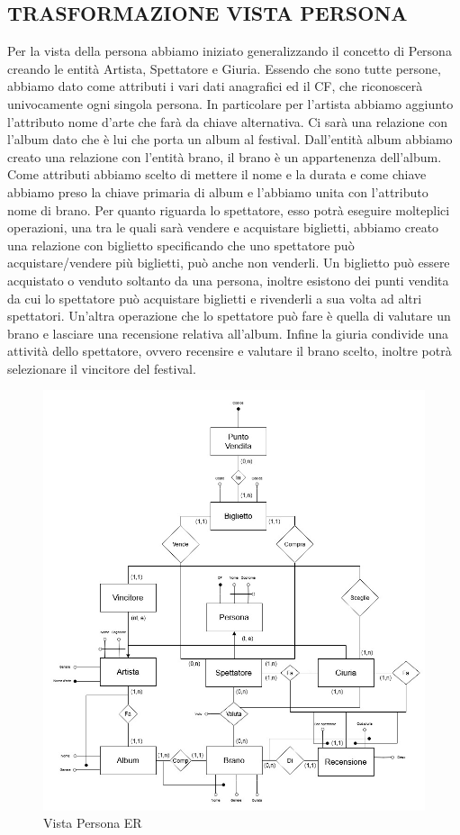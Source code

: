 \documentclass{article}
\begin{document}
\subsection{TRASFORMAZIONE VISTA PERSONA}
\noindent
Per la vista della persona abbiamo iniziato generalizzando il concetto di Persona creando le entità Artista, Spettatore e Giuria. Essendo che sono tutte persone, abbiamo dato come attributi i vari dati anagrafici ed il CF, che riconoscerà univocamente ogni singola persona. In particolare per l'artista abbiamo aggiunto l'attributo nome d'arte che farà da chiave alternativa. Ci sarà una relazione con l'album dato che è lui che porta un album al festival. Dall'entità album abbiamo creato una relazione con l'entità brano, il brano è un appartenenza dell'album. Come attributi abbiamo scelto di mettere il nome e la durata e come chiave abbiamo preso la chiave primaria di album e l'abbiamo unita con l'attributo nome di brano. Per quanto riguarda lo spettatore, esso potrà eseguire molteplici operazioni, una tra le quali sarà vendere e acquistare biglietti, abbiamo creato una relazione con biglietto specificando che uno spettatore può acquistare/vendere più biglietti, può anche non venderli. Un biglietto può essere acquistato o venduto soltanto da una persona, inoltre esistono dei punti vendita da cui lo spettatore può acquistare biglietti e rivenderli a sua volta ad altri spettatori. Un'altra operazione che lo spettatore può fare è quella di valutare un brano e lasciare una recensione relativa all'album. Infine la giuria condivide una attività dello spettatore, ovvero recensire e valutare il brano scelto, inoltre potrà selezionare il vincitore del festival.
\begin{figure}[h]
    \centering
    \includegraphics[width=0.9\linewidth]{Vista Persona ER.jpg}
    \caption{Vista Persona ER}
    \label{fig:enter-label}
\end{figure}
\newpage
\end{document}
